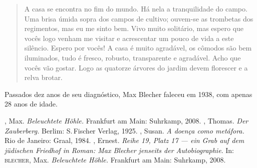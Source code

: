 \begin{quote}
A casa se encontra no fim do mundo. Há nela a tranquilidade do campo.
Uma brisa úmida sopra dos campos de cultivo; ouvem-se as trombetas dos
regimentos, mas eu me sinto bem. Vivo muito solitário, mas espero que
vocês logo venham me visitar e acrescentar um pouco de vida a este
silêncio. Espero por vocês! A casa é muito agradável, os cômodos são bem
iluminados, tudo é fresco, robusto, transparente e agradável. Acho que
vocês vão gostar. Logo as quatorze árvores do jardim devem florescer e a
relva brotar.
\end{quote}

Passados dez anos de seu diagnóstico, Max Blecher faleceu em 1938, com
apenas 28 anos de idade.

\begin{bibliohedra}
, Max. \textit{Beleuchtete Höhle.} Frankfurt am Main: Suhrkamp, 2008.
, Thomas. \textit{Der Zauberberg.} Berlim: S.\,Fischer Verlag, 1925.
, Susan. \textit{A doença como metáfora.} Rio de Janeiro: Graal, 1984.
, Ernest. \textit{Reihe 19, Platz 17 --- ein Grab auf dem jüdischen Friedhof in Roman: Max Blecher jenseits der Autobiographie}. In: \textsc{blecher}, Max. \textit{Beleuchtete Höhle.} Frankfurt am Main: Suhrkamp, 2008.
\end{bibliohedra}